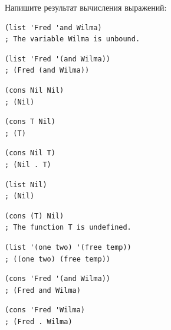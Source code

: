 \documentclass[a4paper]{report}
\begin{document}
\begin{task}
	Напишите результат вычисления выражений:
	\begin{AutoMultiColEnumerate}
		\item
\begin{lstlisting}[style=lispinline]
(list 'Fred 'and Wilma)
; The variable Wilma is unbound.
\end{lstlisting}

		\item
\begin{lstlisting}[style=lispinline]
(list 'Fred '(and Wilma))
; (Fred (and Wilma))
\end{lstlisting}

		\item
\begin{lstlisting}[style=lispinline]
(cons Nil Nil)
; (Nil)
\end{lstlisting}

		\item
\begin{lstlisting}[style=lispinline]
(cons T Nil)
; (T)
\end{lstlisting}

		\item
\begin{lstlisting}[style=lispinline]
(cons Nil T)
; (Nil . T)
\end{lstlisting}

		\item
\begin{lstlisting}[style=lispinline]
(list Nil)
; (Nil)
\end{lstlisting}

		\item
\begin{lstlisting}[style=lispinline]
(cons (T) Nil)
; The function T is undefined.
\end{lstlisting}

		\item
\begin{lstlisting}[style=lispinline]
(list '(one two) '(free temp))
; ((one two) (free temp))
\end{lstlisting}

		\item
\begin{lstlisting}[style=lispinline]
(cons 'Fred '(and Wilma))
; (Fred and Wilma)
\end{lstlisting}

		\item
\begin{lstlisting}[style=lispinline]
(cons 'Fred 'Wilma)
; (Fred . Wilma)
\end{lstlisting}


\end{AutoMultiColEnumerate}
\end{task}
\end{document}
